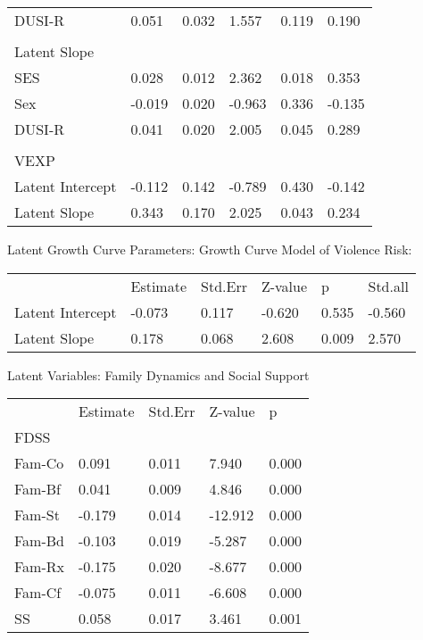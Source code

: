 \documentclass[utf8]{frontiersSCNS} %
\begin{document}
\begin{table}[]
\begin{tabular}{llllll}
DUSI-R               & 0.051    & 0.032   & 1.557   & 0.119 & 0.190   \\
                     &          &         &         &       &         \\
Latent Slope         &          &         &         &       &         \\
SES                  & 0.028    & 0.012   & 2.362   & 0.018 & 0.353   \\
Sex                  & -0.019   & 0.020   & -0.963  & 0.336 & -0.135  \\
DUSI-R               & 0.041    & 0.020   & 2.005   & 0.045 & 0.289   \\
                     &          &         &         &       &         \\
VEXP                 &          &         &         &       &         \\
Latent Intercept     & -0.112   & 0.142   & -0.789  & 0.430 & -0.142  \\
Latent Slope         & 0.343    & 0.170   & 2.025   & 0.043 & 0.234  
\end{tabular}
\end{table}

Latent Growth Curve Parameters: Growth Curve Model of Violence Risk:
\begin{table}[]
\begin{tabular}{llllll}
                 & Estimate & Std.Err & Z-value & p     & Std.all \\
Latent Intercept & -0.073   & 0.117   & -0.620  & 0.535 & -0.560  \\
Latent Slope     & 0.178    & 0.068   & 2.608   & 0.009 & 2.570  
\end{tabular}
\end{table}


Latent Variables: Family Dynamics and Social Support
\begin{table}[]
\begin{tabular}{lllll}
       & Estimate & Std.Err & Z-value & p     \\
FDSS   &          &         &         &       \\
Fam-Co & 0.091    & 0.011   & 7.940   & 0.000 \\
Fam-Bf & 0.041    & 0.009   & 4.846   & 0.000 \\
Fam-St & -0.179   & 0.014   & -12.912 & 0.000 \\
Fam-Bd & -0.103   & 0.019   & -5.287  & 0.000 \\
Fam-Rx & -0.175   & 0.020   & -8.677  & 0.000 \\
Fam-Cf & -0.075   & 0.011   & -6.608  & 0.000 \\
SS     & 0.058    & 0.017   & 3.461   & 0.001
\end{tabular}
\end{table}
\end{document}
